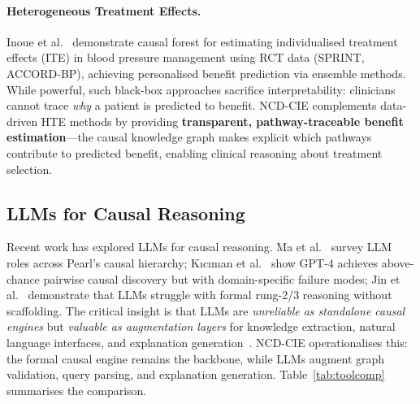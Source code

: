 \documentclass[runningheads]{llncs}
\begin{document}
\paragraph{Heterogeneous Treatment Effects.}
Inoue et al.~\cite{inoue2023causalforest} demonstrate causal forest
for estimating individualised treatment effects (ITE) in blood pressure
management using RCT data (SPRINT, ACCORD-BP), achieving personalised
benefit prediction via ensemble methods.
While powerful, such black-box approaches sacrifice interpretability:
clinicians cannot trace \emph{why} a patient is predicted to benefit.
NCD-CIE complements data-driven HTE methods by providing
\textbf{transparent, pathway-traceable benefit estimation}---the
causal knowledge graph makes explicit which pathways contribute to
predicted benefit, enabling clinical reasoning about treatment
selection.

\subsection{LLMs for Causal Reasoning}\label{sec:llmcausal}

Recent work has explored LLMs for causal reasoning.
Ma et al.~\cite{ma2024causal} survey LLM roles across Pearl's
causal hierarchy; K{\i}c{\i}man et al.~\cite{kiciman2023causal}
show GPT-4 achieves above-chance pairwise causal discovery but
with domain-specific failure modes; Jin et al.~\cite{jin2023cladder}
demonstrate that LLMs struggle with formal rung-2/3 reasoning
without scaffolding.
The critical insight is that LLMs are \emph{unreliable as standalone
causal engines} but \emph{valuable as augmentation layers} for
knowledge extraction, natural language interfaces, and explanation
generation~\cite{ma2024causal}.
NCD-CIE operationalises this: the formal causal engine remains
the backbone, while LLMs augment graph validation, query parsing,
and explanation generation.
Table~\ref{tab:toolcomp} summarises the comparison.
\end{document}
